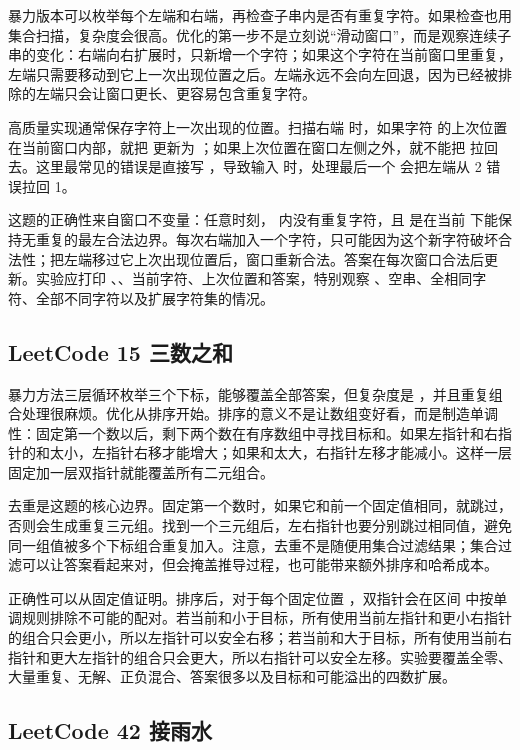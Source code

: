 暴力版本可以枚举每个左端和右端，再检查子串内是否有重复字符。如果检查也用集合扫描，复杂度会很高。优化的第一步不是立刻说“滑动窗口”，而是观察连续子串的变化：右端向右扩展时，只新增一个字符；如果这个字符在当前窗口里重复，左端只需要移动到它上一次出现位置之后。左端永远不会向左回退，因为已经被排除的左端只会让窗口更长、更容易包含重复字符。

高质量实现通常保存字符上一次出现的位置。扫描右端  时，如果字符  的上次位置在当前窗口内部，就把  更新为 ；如果上次位置在窗口左侧之外，就不能把  拉回去。这里最常见的错误是直接写 ，导致输入  时，处理最后一个  会把左端从 2 错误拉回 1。

这题的正确性来自窗口不变量：任意时刻， 内没有重复字符，且  是在当前  下能保持无重复的最左合法边界。每次右端加入一个字符，只可能因为这个新字符破坏合法性；把左端移过它上次出现位置后，窗口重新合法。答案在每次窗口合法后更新。实验应打印 、、当前字符、上次位置和答案，特别观察 、空串、全相同字符、全部不同字符以及扩展字符集的情况。

\subsection{LeetCode 15 三数之和}

暴力方法三层循环枚举三个下标，能够覆盖全部答案，但复杂度是 ，并且重复组合处理很麻烦。优化从排序开始。排序的意义不是让数组变好看，而是制造单调性：固定第一个数以后，剩下两个数在有序数组中寻找目标和。如果左指针和右指针的和太小，左指针右移才能增大；如果和太大，右指针左移才能减小。这样一层固定加一层双指针就能覆盖所有二元组合。

去重是这题的核心边界。固定第一个数时，如果它和前一个固定值相同，就跳过，否则会生成重复三元组。找到一个三元组后，左右指针也要分别跳过相同值，避免同一组值被多个下标组合重复加入。注意，去重不是随便用集合过滤结果；集合过滤可以让答案看起来对，但会掩盖推导过程，也可能带来额外排序和哈希成本。

正确性可以从固定值证明。排序后，对于每个固定位置 ，双指针会在区间  中按单调规则排除不可能的配对。若当前和小于目标，所有使用当前左指针和更小右指针的组合只会更小，所以左指针可以安全右移；若当前和大于目标，所有使用当前右指针和更大左指针的组合只会更大，所以右指针可以安全左移。实验要覆盖全零、大量重复、无解、正负混合、答案很多以及目标和可能溢出的四数扩展。

\subsection{LeetCode 42 接雨水}

